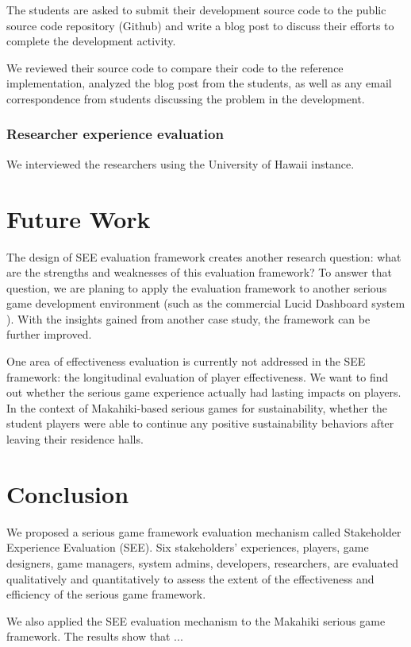 \documentclass{sigchi}
\begin{document}
The students are asked to submit their development source code to the public source code repository (Github) and write a blog post to discuss their efforts to complete the development activity.

We reviewed their source code to compare their code to the reference implementation, analyzed the blog post from the students, as well as any email correspondence from students discussing the problem in the development.

\subsubsection{Researcher experience evaluation}
We interviewed the researchers using the University of Hawaii instance.

\section{Future Work}
The design of SEE evaluation framework creates another research question: what are the strengths and weaknesses of this evaluation framework? To answer that question, we are planing to apply the evaluation framework to another serious game development environment (such as the commercial Lucid Dashboard system \cite{building-dashboard}). With the insights gained from another case study, the framework can be further improved.

One area of effectiveness evaluation is currently not addressed in the SEE framework: the longitudinal evaluation of player effectiveness.  We want to find out whether the serious game experience actually had lasting impacts on players. In the context of Makahiki-based serious games for sustainability, whether the student players were able to continue any positive sustainability behaviors after leaving their residence halls.

\section{Conclusion}
We proposed a serious game framework evaluation mechanism called Stakeholder Experience Evaluation (SEE). Six stakeholders' experiences, players, game designers, game managers, system admins, developers, researchers, are evaluated qualitatively and quantitatively to assess the extent of the effectiveness and efficiency of the serious game framework.

We also applied the SEE evaluation mechanism to the Makahiki serious game framework. The results show that ...
\end{document}
